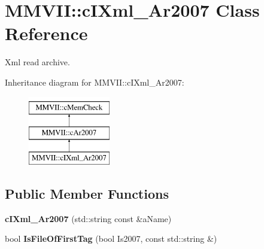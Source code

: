 \hypertarget{classMMVII_1_1cIXml__Ar2007}{}\section{M\+M\+V\+II\+:\+:c\+I\+Xml\+\_\+\+Ar2007 Class Reference}
\label{classMMVII_1_1cIXml__Ar2007}


Xml read archive.  


Inheritance diagram for M\+M\+V\+II\+:\+:c\+I\+Xml\+\_\+\+Ar2007\+:\begin{figure}[H]
\begin{center}
\leavevmode
\includegraphics[height=3.000000cm]{classMMVII_1_1cIXml__Ar2007}
\end{center}
\end{figure}
\subsection*{Public Member Functions}
\begin{DoxyCompactItemize}
\item 
{\bfseries c\+I\+Xml\+\_\+\+Ar2007} (std\+::string const \&a\+Name)\hypertarget{classMMVII_1_1cIXml__Ar2007_a9f9e0e2e7eb987a7e5d42f8257459bc6}{}\label{classMMVII_1_1cIXml__Ar2007_a9f9e0e2e7eb987a7e5d42f8257459bc6}

\item 
bool {\bfseries Is\+File\+Of\+First\+Tag} (bool Is2007, const std\+::string \&)\hypertarget{classMMVII_1_1cIXml__Ar2007_ae791aad904bda1505092229398b6704e}{}\label{classMMVII_1_1cIXml__Ar2007_ae791aad904bda1505092229398b6704e}

\end{DoxyCompactItemize}
